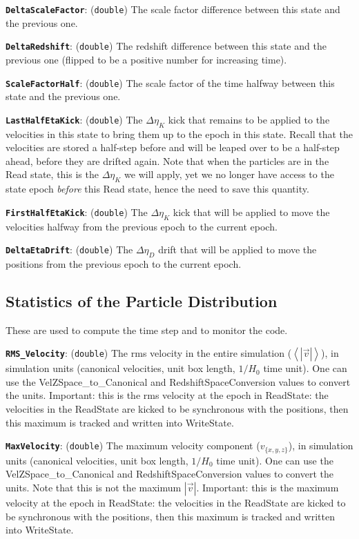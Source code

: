 \documentclass[11pt,preprint]{aastex}
\newcommand{\param}[2]{\medskip\noindent\textbf{\texttt{#1}}: ({\tt #2}) }
\begin{document}
\param{DeltaScaleFactor}{double} The scale factor difference between
this state and the previous one.

\param{DeltaRedshift}{double} The redshift difference between this
state and the previous one (flipped to be a positive number for increasing
time).

\param{ScaleFactorHalf}{double} The scale factor of the time halfway
between this state and the previous one.

\param{LastHalfEtaKick}{double} The $\Delta\eta_K$ kick that remains
to be applied to the velocities in this state to bring them up to
the epoch in this state.  Recall that the velocities are stored a 
half-step before and will be leaped over to be a half-step ahead, 
before they are drifted again.  Note that when the particles are in
the Read state, this is the $\Delta\eta_K$ we will apply, yet we 
no longer have access to the state epoch {\it before} this Read state,
hence the need to save this quantity.

\param{FirstHalfEtaKick}{double} The $\Delta\eta_K$ kick that will
be applied to move the velocities halfway from the previous epoch
to the current epoch.

\param{DeltaEtaDrift}{double} The $\Delta\eta_D$ drift that will
be applied to move the positions from the previous epoch
to the current epoch.

\subsection{Statistics of the Particle Distribution}
These are used to compute the time step and to monitor the code.

\param{RMS\_Velocity}{double}
The rms velocity in the entire simulation ($\left<|\vec{v}|\right>$),
in simulation units (canonical velocities, unit box length, $1/H_0$
time unit).  One can use the VelZSpace\_to\_Canonical and
RedshiftSpaceConversion values to convert the units.  Important:
this is the rms velocity at the epoch in ReadState: the velocities
in the ReadState are kicked to be synchronous with the positions,
then this maximum is tracked and written into WriteState.

\param{MaxVelocity}{double} The maximum velocity component
($v_{\{x,y,z\}}$), in simulation units (canonical velocities, unit
box length, $1/H_0$ time unit).  One can use the VelZSpace\_to\_Canonical
and RedshiftSpaceConversion values to convert the units.  Note that
this is not the maximum $|\vec{v}|$.  Important: this is the maximum
velocity at the epoch in ReadState: the velocities in the ReadState
are kicked to be synchronous with the positions, then this maximum
is tracked and written into WriteState.
\end{document}
